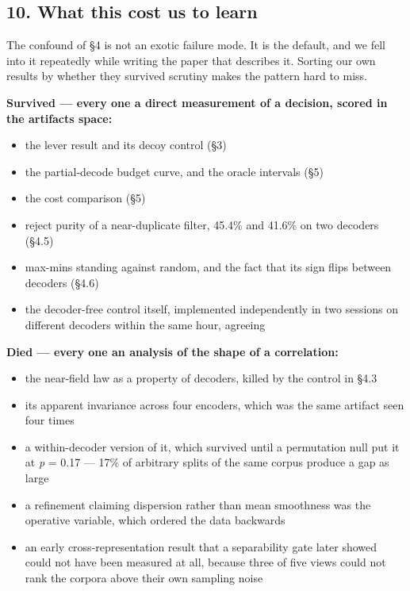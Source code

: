 \documentclass[
  10pt,
]{article}
\providecommand{\tightlist}{%
  \setlength{\itemsep}{0pt}\setlength{\parskip}{0pt}}
\theoremstyle{plain}
\theoremstyle{definition}
\providecommand{\tightlist}{\setlength{\itemsep}{0pt}\setlength{\parskip}{0pt}}
\begin{document}
\subsection{10. What this cost us to
learn}\label{10-what-this-cost-us-to-learn}

The confound of §4 is not an exotic failure mode. It is the default, and
we fell into it repeatedly while writing the paper that describes it.
Sorting our own results by whether they survived scrutiny makes the
pattern hard to miss.

\textbf{Survived --- every one a direct measurement of a decision,
scored in the artifact\textquotesingle s space:}

\begin{itemize}
\tightlist
\item
  the lever result and its decoy control (§3)
\item
  the partial-decode budget curve, and the oracle intervals (§5)
\item
  the cost comparison (§5)
\item
  reject purity of a near-duplicate filter, 45.4\% and 41.6\% on two
  decoders (§4.5)
\item
  max-min\textquotesingle s standing against random, and the fact that
  its sign flips between decoders (§4.6)
\item
  the decoder-free control itself, implemented independently in two
  sessions on different decoders within the same hour, agreeing
\end{itemize}

\textbf{Died --- every one an analysis of the shape of a correlation:}

\begin{itemize}
\tightlist
\item
  the near-field law as a property of decoders, killed by the control in
  §4.3
\item
  its apparent invariance across four encoders, which was the same
  artifact seen four times
\item
  a within-decoder version of it, which survived until a permutation
  null put it at \emph{p} = 0.17 --- 17\% of arbitrary splits of the
  same corpus produce a gap as large
\item
  a refinement claiming dispersion rather than mean smoothness was the
  operative variable, which ordered the data backwards
\item
  an early cross-representation result that a separability gate later
  showed could not have been measured at all, because three of five
  views could not rank the corpora above their own sampling noise
\end{itemize}
\end{document}
